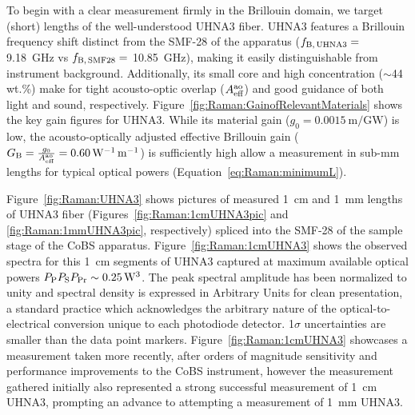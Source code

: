 To begin with a clear measurement firmly in the Brillouin domain, we target (short) lengths of the well-understood \ac{UHNA3} fiber. \cite{behunin2015long} \ac{UHNA3} features a Brillouin frequency shift distinct from the \ac{SMF-28} of the apparatus (\(f_{\rm B,\,UHNA3} =\) \SI{9.18}{\giga\hertz} vs \(f_{\rm B,\,SMF28} =\) \SI{10.85}{\giga\hertz}), making it easily distinguishable from instrument background. Additionally, its small core and high  concentration (\(\sim\)44 wt.\%) make for tight acousto-optic overlap (\(A_{\rm eff}^{\rm ao}\)) and good guidance of both light and sound, respectively. Figure~\ref{fig:Raman:GainofRelevantMaterials} shows the key gain figures for \ac{UHNA3}. While its material gain (\(g_{0} = \SI{0.0015}{\meter\per\giga\watt}\)) is low, the acousto-optically adjusted effective Brillouin gain (\(G_{\rm B} = \frac{g_{0}}{A_{\rm eff}^{\rm ao}} = \SI{0.60}{\per\watt\per\meter}\)) is sufficiently high allow a measurement in sub-\si{\milli\meter} lengths for typical optical powers (Equation~\ref{eq:Raman:minimumL}).

Figure~\ref{fig:Raman:UHNA3} shows pictures of measured \SI{1}{\centi\meter} and \SI{1}{\milli\meter} lengths of \ac{UHNA3} fiber (Figures~\ref{fig:Raman:1cmUHNA3pic} and \ref{fig:Raman:1mmUHNA3pic}, respectively) spliced into the \ac{SMF-28} of the sample stage of the \ac{CoBS} apparatus. Figure~\ref{fig:Raman:1cmUHNA3} shows the observed spectra for this \SI{1}{\centi\meter} segments of \ac{UHNA3} captured at maximum available optical powers \(P_{\rm P}P_{\rm S}P_{\rm Pr} \sim \SI{0.25}{\cubic\watt}\). The peak spectral amplitude has been normalized to unity and spectral density is expressed in Arbitrary Units for clean presentation, a standard practice which acknowledges the arbitrary nature of the optical-to-electrical conversion unique to each photodiode detector. 1\(\sigma\) uncertainties are smaller than the data point markers. Figure~\ref{fig:Raman:1cmUHNA3} showcases a measurement taken more recently, after orders of magnitude sensitivity and performance improvements to the \ac{CoBS} instrument, however the measurement gathered initially also represented a strong successful measurement of \SI{1}{\centi\meter} \ac{UHNA3}, prompting an advance to attempting a measurement of \SI{1}{\milli\meter} \ac{UHNA3}.

